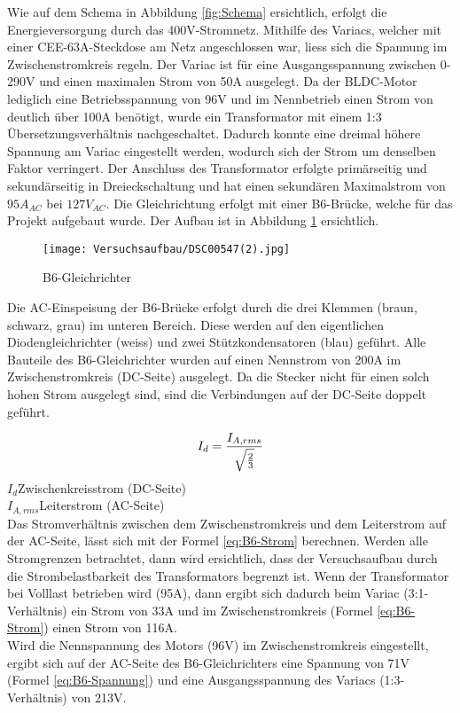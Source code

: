 Wie auf dem Schema in Abbildung \ref{fig:Schema} ersichtlich, erfolgt die Energieversorgung durch das 400V-Stromnetz. Mithilfe des Variacs, welcher mit einer CEE-63A-Steckdose am Netz angeschlossen war, liess sich die Spannung im Zwischenstromkreis regeln. Der Variac ist für eine Ausgangsspannung zwischen 0-290V und einen maximalen Strom von 50A ausgelegt. Da der BLDC-Motor lediglich eine Betriebsspannung von 96V und im Nennbetrieb einen Strom von deutlich über 100A benötigt, wurde ein Transformator mit einem 1:3 Übersetzungsverhältnis nachgeschaltet. Dadurch konnte eine dreimal höhere Spannung am Variac eingestellt werden, wodurch sich der Strom um denselben Faktor verringert. Der Anschluss des Transformator erfolgte primärseitig und sekundärseitig in Dreieckschaltung und hat einen sekundären Maximalstrom von $95A_{AC}$ bei $127V_{AC}$. Die Gleichrichtung erfolgt mit einer B6-Brücke, welche für das Projekt aufgebaut wurde. Der Aufbau ist in Abbildung \ref{fig:B6} ersichtlich.

\begin{figure}[H]
	\centering
	\texttt{[image: Versuchsaufbau/DSC00547(2).jpg]}
	\caption[B6-Gleichrichter]{B6-Gleichrichter}
	\label{fig:B6}
\end{figure}

Die AC-Einspeisung der B6-Brücke erfolgt durch die drei Klemmen (braun, schwarz, grau) im unteren Bereich. Diese werden auf den eigentlichen Diodengleichrichter (weiss) und zwei Stützkondensatoren (blau) geführt. Alle Bauteile des B6-Gleichrichter wurden auf einen Nennstrom von 200A im Zwischenstromkreis (DC-Seite) ausgelegt. Da die Stecker nicht für einen solch hohen Strom ausgelegt sind, sind die Verbindungen auf der DC-Seite doppelt geführt.

\begin{equation}
\centering
I_{d}=\frac{I_{A,rms}}{\sqrt{\frac{2}{3}}}
\label{eq:B6-Strom}
\end{equation}
$ I_{d} $\qquad\quad 	Zwischenkreisstrom (DC-Seite)      \\
$ I_{A,rms} $\quad Leiterstrom (AC-Seite)    \\

Das Stromverhältnis zwischen dem Zwischenstromkreis und dem Leiterstrom auf der AC-Seite, lässt sich mit der Formel \ref{eq:B6-Strom} berechnen. Werden alle Stromgrenzen betrachtet, dann wird ersichtlich, dass der Versuchsaufbau durch die Strombelastbarkeit des Transformators begrenzt ist. Wenn der Transformator bei Volllast betrieben wird (95A), dann ergibt sich dadurch beim Variac (3:1-Verhältnis) ein Strom von 33A und im Zwischenstromkreis (Formel \ref{eq:B6-Strom}) einen Strom von 116A.\\
Wird die Nennspannung des Motors (96V) im Zwischenstromkreis eingestellt, ergibt sich auf der AC-Seite des B6-Gleichrichters eine Spannung von 71V (Formel \ref{eq:B6-Spannung}) und eine Ausgangsspannung des Variacs (1:3-Verhältnis) von 213V.

